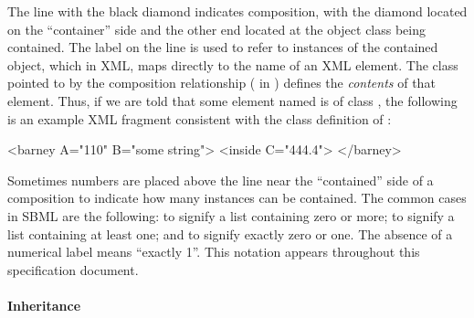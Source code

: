 The line with the black diamond indicates composition,
with the diamond located on the ``container'' side and the other
end located at the object class being contained.  The label on the
line is used to refer to instances of the contained
object, which in XML, maps directly to the name of an XML element.
The class pointed to by the composition relationship (
in ) defines the \emph{contents} of
that element.  Thus, if we are told that some element named
 is of class , the following is an
example XML fragment consistent with the class definition of
:

\begin{example}
<barney A="110" B="some string">
    <inside C="444.4">
</barney>
\end{example}

Sometimes numbers are placed above the line near the ``contained''
side of a composition to indicate how many instances can be
contained.  The common cases in SBML are the following:
\token{[0..*]} to signify a list containing zero or more;
\token{[1..*]} to signify a list containing at least one; and
\token{[0..1]} to signify exactly zero or one.  The absence of a
numerical label means ``exactly 1''.  This notation appears
throughout this specification document.


\clearpage

\paragraph{Inheritance}

